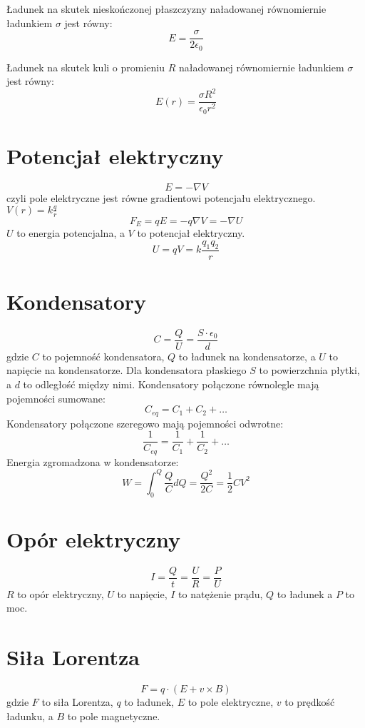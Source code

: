\documentclass{../konspekt}
\begin{document}
\begin{multicols}{2}
  Ładunek na skutek nieskończonej płaszczyzny naładowanej równomiernie
  ładunkiem $\sigma$ jest równy:
  $$
  E = \frac{\sigma}{2\epsilon_0}
  $$

  Ładunek na skutek kuli o promieniu $R$ naładowanej równomiernie
  ładunkiem $\sigma$ jest równy:
  $$
  E(r) = \frac{\sigma R^2}{\epsilon_0 r^2}
  $$

  \section{Potencjał elektryczny}

  $$
  E = - \nabla V
  $$
  czyli pole elektryczne jest równe gradientowi potencjału
  elektrycznego. $V(r) = k\frac{q}{r}$
  $$
  F_E = qE = -q \nabla V = - \nabla U
  $$
  $U$ to energia potencjalna, a $V$ to potencjał elektryczny.
  $$
  U = qV = k \frac{q_1 q_2}{r}
  $$

  \section{Kondensatory}

  $$
  C = \frac{Q}{U} = \frac{S \cdot \epsilon_0}{d}
  $$
  gdzie $C$ to pojemność kondensatora, $Q$ to ładunek na
  kondensatorze, a $U$ to napięcie na kondensatorze. Dla kondensatora
  płaskiego $S$ to powierzchnia płytki, a $d$ to odległość między
  nimi. Kondensatory połączone równolegle mają pojemności sumowane:
  $$
  C_{eq} = C_1 + C_2 + \ldots
  $$
  Kondensatory połączone szeregowo mają pojemności odwrotne:
  $$
  \frac{1}{C_{eq}} = \frac{1}{C_1} + \frac{1}{C_2} + \ldots
  $$
  Energia zgromadzona w kondensatorze:
  $$
  W = \int_{0}^{Q} \frac{Q}{C} dQ = \frac{Q^2}{2C} = \frac{1}{2} C V^2
  $$

  \section{Opór elektryczny}

  $$
  I = \frac{Q}{t} = \frac{U}{R} = \frac{P}{U}
  $$
  $R$ to opór elektryczny, $U$ to napięcie, $I$ to natężenie prądu,
  $Q$ to ładunek a $P$ to moc.

  \section{Siła Lorentza}

  $$
  F = q \cdot (E + v \times B)
  $$
  gdzie $F$ to siła Lorentza, $q$ to ładunek, $E$ to pole elektryczne,
  $v$ to prędkość ładunku, a $B$ to pole magnetyczne.


\end{multicols}
\end{document}
